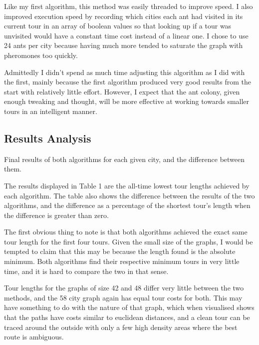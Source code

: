 \documentclass[a4paper,11pt]{article}
\begin{document}
Like my first algorithm, this method was easily threaded to improve speed. I
also improved execution speed by recording which cities each ant had visited in
its current tour in an array of boolean values so that looking up if a tour was
unvisited would have a constant time cost instead of a linear one. I chose to
use 24 ants per city because having much more tended to saturate the graph with
pheromones too quickly.

Admittedly I didn't spend as much time adjusting this algorithm as I did with
the first, mainly because the first algorithm produced very good results from
the start with relatively little effort. However, I expect that the ant colony,
given enough tweaking and thought, will be more effective at working towards
smaller tours in an intelligent manner.

\subsection*{Results Analysis}
\begin{table}
\begin{center}

\caption{Final results of both algorithms for each given city, and the
	difference between them.}
\end{center}
\end{table}

The results displayed in Table 1 are the all-time lowest tour lengths
achieved by each algorithm. The table also shows the difference between the
results of the two algorithms, and the difference as a percentage of the
shortest tour's length when the difference is greater than zero.

The first obvious thing to note is that both algorithms achieved the exact same
tour length for the first four tours. Given the small size of the graphs,
I would be tempted to claim that this may be because the length found is the
absolute minimum. Both algorithms find their respective minimum tours in very
little time, and it is hard to compare the two in that sense.

Tour lengths for the graphs of size 42 and 48 differ very little between
the two methods, and the 58 city graph again has equal tour costs for both.
This may have something to do with the nature of that graph, which when
visualised shows that the paths have costs similar to euclidean distances, and
a clean tour can be traced around the outside with only a few high density
areas where the best route is ambiguous.
\end{document}
